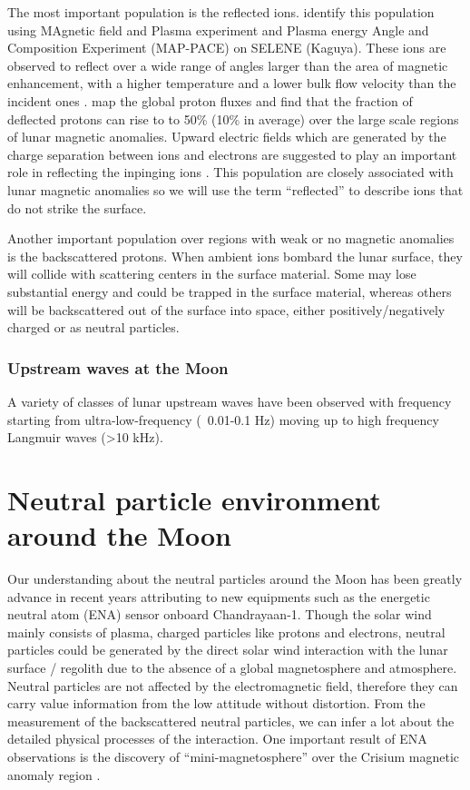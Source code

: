 The most important population is the reflected ions. \cite{saitoInflightPerformanceInitial2010} identify this population using MAgnetic field and Plasma experiment and Plasma energy Angle and Composition Experiment (MAP-PACE) on SELENE (Kaguya). These ions are observed to reflect over a wide range of angles larger than the area of magnetic enhancement, with a higher temperature and a lower bulk flow velocity than the incident ones \citep{saitoSimultaneousObservationElectron2012}. \cite{lueStrongInfluenceLunar2011} map the global proton fluxes and find that the fraction of deflected protons can rise to to 50\% (10\% in average) over the large scale regions of lunar magnetic anomalies. Upward electric fields which are generated by the charge separation between ions and electrons are suggested to play an important role in reflecting the inpinging ions \citep{jarvinenVerticalElectricFields2014}. This population are closely associated with lunar magnetic anomalies so we will use the term “reflected” to describe ions that do not strike the surface. 

Another important population over regions with weak or no magnetic anomalies is the backscattered protons. When ambient ions bombard the lunar surface, they will collide with scattering centers in the surface material. Some may lose substantial energy and could be trapped in the surface material, whereas others will be backscattered out of the surface into space, either positively/negatively charged or as neutral particles.


\subsubsection{Upstream waves at the Moon}

A variety of classes of lunar upstream waves have been observed with frequency starting from ultra-low-frequency (~0.01-0.1 Hz) moving up to high frequency Langmuir waves (>10 kHz).


\section{Neutral particle environment around the Moon}

Our understanding about the neutral particles around the Moon has been greatly advance in recent years attributing to new equipments such as the energetic neutral atom (ENA) sensor onboard Chandrayaan-1. Though the solar wind mainly consists of plasma, charged particles like protons and electrons​, neutral particles could be generated by the direct solar wind interaction with the lunar surface / regolith due to the absence of a global magnetosphere and atmosphere. Neutral particles are not affected by the electromagnetic field, therefore they can carry value information from the low attitude without distortion. From the measurement of the backscattered neutral particles, we can infer a lot about the detailed physical processes of the interaction. One important result of ENA observations is the discovery of “mini-magnetosphere” over the Crisium magnetic anomaly region \citep{wieserFirstObservationMinimagnetosphere2010}.

